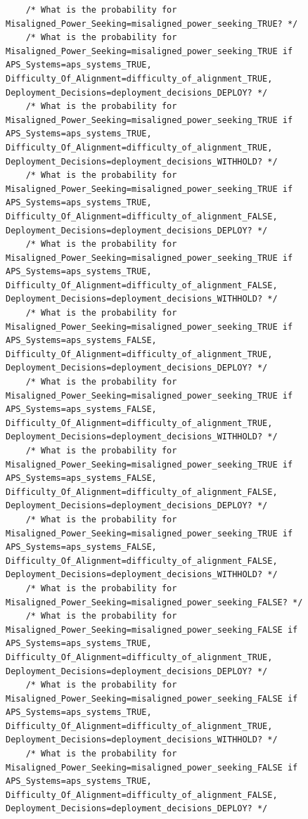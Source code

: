 \documentclass[
  11pt,
  letterpaper,
]{book}
\begin{document}
\begin{verbatim}
    /* What is the probability for Misaligned_Power_Seeking=misaligned_power_seeking_TRUE? */
    /* What is the probability for Misaligned_Power_Seeking=misaligned_power_seeking_TRUE if APS_Systems=aps_systems_TRUE, Difficulty_Of_Alignment=difficulty_of_alignment_TRUE, Deployment_Decisions=deployment_decisions_DEPLOY? */
    /* What is the probability for Misaligned_Power_Seeking=misaligned_power_seeking_TRUE if APS_Systems=aps_systems_TRUE, Difficulty_Of_Alignment=difficulty_of_alignment_TRUE, Deployment_Decisions=deployment_decisions_WITHHOLD? */
    /* What is the probability for Misaligned_Power_Seeking=misaligned_power_seeking_TRUE if APS_Systems=aps_systems_TRUE, Difficulty_Of_Alignment=difficulty_of_alignment_FALSE, Deployment_Decisions=deployment_decisions_DEPLOY? */
    /* What is the probability for Misaligned_Power_Seeking=misaligned_power_seeking_TRUE if APS_Systems=aps_systems_TRUE, Difficulty_Of_Alignment=difficulty_of_alignment_FALSE, Deployment_Decisions=deployment_decisions_WITHHOLD? */
    /* What is the probability for Misaligned_Power_Seeking=misaligned_power_seeking_TRUE if APS_Systems=aps_systems_FALSE, Difficulty_Of_Alignment=difficulty_of_alignment_TRUE, Deployment_Decisions=deployment_decisions_DEPLOY? */
    /* What is the probability for Misaligned_Power_Seeking=misaligned_power_seeking_TRUE if APS_Systems=aps_systems_FALSE, Difficulty_Of_Alignment=difficulty_of_alignment_TRUE, Deployment_Decisions=deployment_decisions_WITHHOLD? */
    /* What is the probability for Misaligned_Power_Seeking=misaligned_power_seeking_TRUE if APS_Systems=aps_systems_FALSE, Difficulty_Of_Alignment=difficulty_of_alignment_FALSE, Deployment_Decisions=deployment_decisions_DEPLOY? */
    /* What is the probability for Misaligned_Power_Seeking=misaligned_power_seeking_TRUE if APS_Systems=aps_systems_FALSE, Difficulty_Of_Alignment=difficulty_of_alignment_FALSE, Deployment_Decisions=deployment_decisions_WITHHOLD? */
    /* What is the probability for Misaligned_Power_Seeking=misaligned_power_seeking_FALSE? */
    /* What is the probability for Misaligned_Power_Seeking=misaligned_power_seeking_FALSE if APS_Systems=aps_systems_TRUE, Difficulty_Of_Alignment=difficulty_of_alignment_TRUE, Deployment_Decisions=deployment_decisions_DEPLOY? */
    /* What is the probability for Misaligned_Power_Seeking=misaligned_power_seeking_FALSE if APS_Systems=aps_systems_TRUE, Difficulty_Of_Alignment=difficulty_of_alignment_TRUE, Deployment_Decisions=deployment_decisions_WITHHOLD? */
    /* What is the probability for Misaligned_Power_Seeking=misaligned_power_seeking_FALSE if APS_Systems=aps_systems_TRUE, Difficulty_Of_Alignment=difficulty_of_alignment_FALSE, Deployment_Decisions=deployment_decisions_DEPLOY? */

\end{verbatim}
\end{document}
